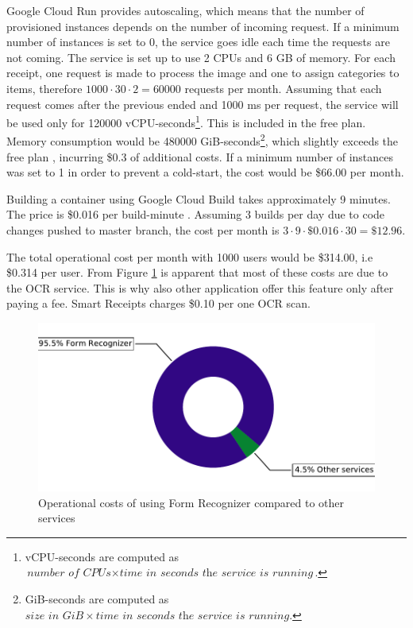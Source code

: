 \documentclass[
  digital, %
  table,   %
  oneside, %
  lof,     %
  lot,     %
]{fithesis3}
\begin{document}
Google Cloud Run provides autoscaling, which means that the number of provisioned instances depends on the number of incoming request. If a minimum number of instances is set to 0, the service goes idle each time the requests are not coming. The service is set up to use 2 CPUs and 6 GB of memory. For each receipt, one request is made to process the image and one to assign categories to items, therefore $\num{1000}\cdot30\cdot2 = \num{60000}$ requests per month. Assuming that each request comes after the previous ended and \num{1000} ms per request, the service will be used only for \num{120000} vCPU-seconds\footnote{vCPU-seconds are computed as $\textit{number of CPUs} \times \textit{time in seconds the service is running}$.}. This is included in the free plan. Memory consumption would be \num{480000} GiB-seconds\footnote{GiB-seconds are computed as $\textit{size in GiB} \times \textit{time in seconds the service is running}.$}, which slightly exceeds the free plan \cite{CloudRunPricing}, incurring \$0.3 of additional costs. 
If a minimum number of instances was set to 1 in order to prevent a cold-start, the cost would be \$66.00 per month.

Building a container using Google Cloud Build takes approximately 9 minutes. The price is \$0.016 per build-minute \cite{CloudBuildPricing}. Assuming 3 builds per day due to code changes pushed to master branch, the cost per month is $3\cdot9\cdot\$0.016\cdot30 = \$12.96$.

The total operational cost per month with \num{1000} users would be \$314.00, i.e \$0.314 per user.
From Figure \ref{fig:operational_costs} is apparent that most of these costs are due to the OCR service. This is why also other application offer this feature only after paying a fee. Smart Receipts charges \$0.10 per one OCR scan.

\begin{figure}
    \begin{center}
        \includegraphics[width=1\textwidth]{figures/graphs/operational_costs}
    \end{center}
    \caption{Operational costs of using Form Recognizer compared to other services}
    \label{fig:operational_costs}
\end{figure}
\end{document}
